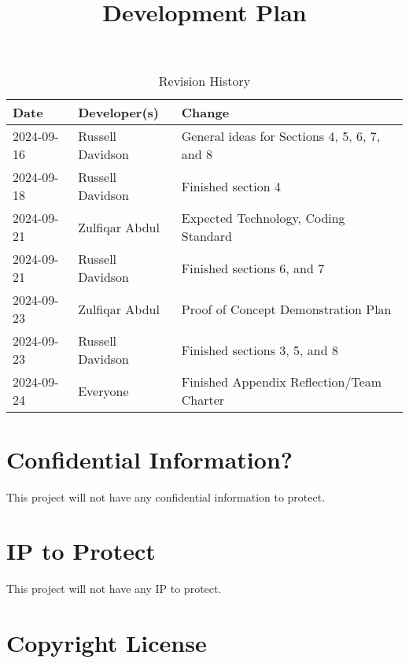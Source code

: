 \documentclass{article}
\title{Development Plan\\\progname}
\author{\authname}
\date{}
\begin{document}
\maketitle

\begin{table}[hp]
\caption{Revision History} \label{TblRevisionHistory}
\begin{tabularx}{\textwidth}{llX}
\toprule
\textbf{Date} & \textbf{Developer(s)} & \textbf{Change}\\
\midrule
2024-09-16 & Russell Davidson & General ideas for Sections 4, 5, 6, 7, and 8\\
2024-09-18 & Russell Davidson & Finished section 4\\
2024-09-21 & Zulfiqar Abdul & Expected Technology, Coding Standard\\
2024-09-21 & Russell Davidson & Finished sections 6, and 7\\
2024-09-23 & Zulfiqar Abdul & Proof of Concept Demonstration Plan\\
2024-09-23 & Russell Davidson & Finished sections 3, 5, and 8\\
2024-09-24 & Everyone & Finished Appendix Reflection/Team Charter\\
\bottomrule
\end{tabularx}
\end{table}

\newpage{}



\section{Confidential Information?}

This project will not have any confidential information to protect.

\section{IP to Protect}

This project will not have any IP to protect.

\section{Copyright License}
\end{document}
